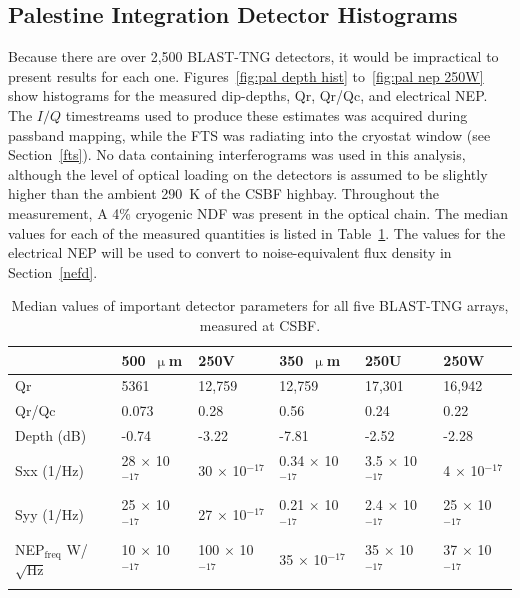 \subsection{Palestine Integration Detector Histograms}\label{histograms}

Because there are over 2,500 BLAST-TNG detectors, it would be impractical to present results for each one. Figures~\ref{fig:pal depth hist} to~\ref{fig:pal nep 250W} show histograms for the measured dip-depths, \gls{Qr}, \gls{Qr}/\gls{Qc}, and electrical NEP\@. The $I/Q$ timestreams used to produce these estimates was acquired during passband mapping, while the FTS was radiating into the cryostat window (see Section~\ref{fts}). No data containing interferograms was used in this analysis, although the level of optical loading on the detectors is assumed to be slightly higher than the ambient 290~K of the CSBF highbay. Throughout the measurement, A 4\% cryogenic NDF was present in the optical chain. The median values for each of the measured quantities is listed in Table~\ref{table:palestine hists}. The values for the electrical NEP will be used to convert to noise-equivalent flux density in Section~\ref{nefd}.

\begin{table}[!htbp]
\centering
\caption[~Median values of important detector parameters for all five BLAST-TNG arrays, measured at CSBF.]{Median values of important detector parameters for all five BLAST-TNG arrays, measured at CSBF.}
\label{table:palestine hists}
\begin{tabular}{@{}llllll@{}}
\dtoprule{}
 & 500~$\upmu$m & 250V & 350~$\upmu$m & 250U & 250W \\ \midrule
\gls{Qr} & 5361 & 12,759 & 12,759 & 17,301 & 16,942 \\
\gls{Qr}/\gls{Qc} & 0.073 & 0.28 & 0.56 & 0.24 & 0.22 \\
Depth (dB) & -0.74 & -3.22 & -7.81 & -2.52 & -2.28 \\
\gls{Sxx} (1/Hz) & 28 $\times$ 10$^{-17}$ & 30 $\times$ 10$^{-17}$ & 0.34 $\times$ 10$^{-17}$ & 3.5 $\times$ 10$^{-17}$ & 4 $\times$ 10$^{-17}$ \\
\gls{Syy} (1/Hz) & 25 $\times$ 10$^{-17}$ & 27 $\times$ 10$^{-17}$ & 0.21 $\times$ 10$^{-17}$ & 2.4 $\times$ 10$^{-17}$ & 25 $\times$ 10$^{-17}$ \\
NEP$_{\mathrm{freq}}$ W/$\sqrt{\mathrm{Hz}}$ & 10 $\times$ 10$^{-17}$ & 100 $\times$ 10$^{-17}$ & 35 $\times$ 10$^{-17}$ & 35 $\times$ 10$^{-17}$ & 37 $\times$ 10$^{-17}$ \\ \dbottomrule{}
\\
\end{tabular}
\end{table}

